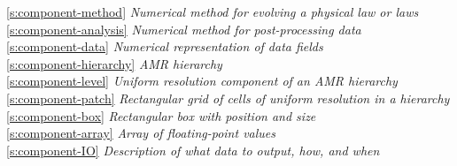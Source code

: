 \begin{tabbing}
\ref{s:component-method}  \>\>            \>\>\> \textit{Numerical method for evolving a physical law or laws} \\
\ref{s:component-analysis}  \>\>          \>\>\> \textit{Numerical method for post-processing data} \\
\ref{s:component-data}  \>\>              \>\>\> \textit{Numerical representation of data fields} \\
\ref{s:component-hierarchy}  \>\>\>         \>\> \textit{AMR hierarchy} \\
\ref{s:component-level}  \>\>\>             \>\> \textit{Uniform resolution component of an AMR hierarchy} \\
\ref{s:component-patch}  \>\>\>             \>\> \textit{Rectangular grid of cells of uniform resolution in a hierarchy} \\
\ref{s:component-box}  \>\>\>\>               \> \textit{Rectangular box with position and size} \\
\ref{s:component-array}  \>\>\>\>             \> \textit{Array of floating-point values} \\
\ref{s:component-IO}  \>\>            \>\>\> \textit{Description of what data to output, how, and when}
\end{tabbing}




















